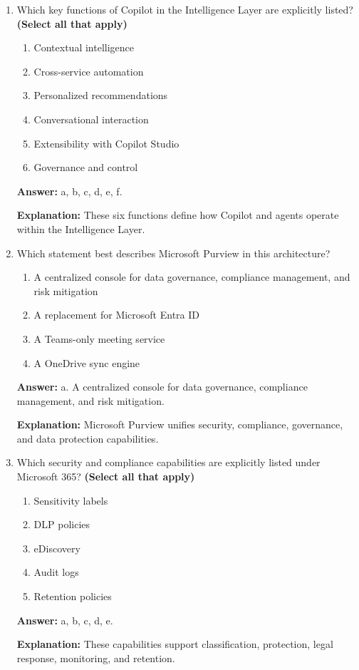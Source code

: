\documentclass[10pt]{article}
\begin{document}
\begin{enumerate}[leftmargin=*]
\item Which key functions of Copilot in the Intelligence Layer are explicitly listed? \textbf{(Select all that apply)}
\begin{enumerate}[label=\alph*., leftmargin=1.5em]
\item Contextual intelligence
\item Cross-service automation
\item Personalized recommendations
\item Conversational interaction
\item Extensibility with Copilot Studio
\item Governance and control
\end{enumerate}
\textbf{Answer:} a, b, c, d, e, f.

\textbf{Explanation:} These six functions define how Copilot and agents operate within the Intelligence Layer.

\item Which statement best describes Microsoft Purview in this architecture?
\begin{enumerate}[label=\alph*., leftmargin=1.5em]
\item A centralized console for data governance, compliance management, and risk mitigation
\item A replacement for Microsoft Entra ID
\item A Teams-only meeting service
\item A OneDrive sync engine
\end{enumerate}
\textbf{Answer:} a. A centralized console for data governance, compliance management, and risk mitigation.

\textbf{Explanation:} Microsoft Purview unifies security, compliance, governance, and data protection capabilities.

\item Which security and compliance capabilities are explicitly listed under Microsoft 365? \textbf{(Select all that apply)}
\begin{enumerate}[label=\alph*., leftmargin=1.5em]
\item Sensitivity labels
\item DLP policies
\item eDiscovery
\item Audit logs
\item Retention policies
\end{enumerate}
\textbf{Answer:} a, b, c, d, e.

\textbf{Explanation:} These capabilities support classification, protection, legal response, monitoring, and retention.


\end{enumerate}
\end{document}
